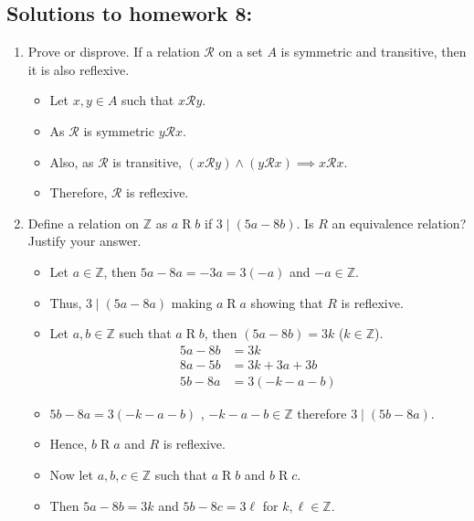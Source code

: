 \documentclass[letterpaper,12pt]{article}
\begin{document}
\subsection*{Solutions to homework 8:}

\begin{enumerate}
\item Prove or disprove. If a relation $\mathcal{R}$ on a set $A$ is symmetric and transitive, then it is also reflexive.
\begin{itemize}
	\item Let $x,y \in A$ such that $x \mathrel \mathcal{R} y$. 
	\item As $\mathcal{R}$ is symmetric $y \mathrel \mathcal{R} x$.
	\item Also, as $\mathcal{R}$ is transitive, $ (x \mathrel \mathcal{R} y) \wedge
	(y \mathrel \mathcal{R} x) \implies x \mathrel \mathcal{R} x$.
	\item Therefore, $\mathcal{R}$ is reflexive.
\end{itemize}
\item Define a relation on $\mathbb{Z}$ as $a \mathrel R b$ if $ 3 \mid (5a-8b).$ Is $R$ an equivalence relation? Justify your answer.
\begin{itemize}
\item Let $a \in \mathbb{Z}$, then $5a-8a = -3a = 3(-a)$ and $-a \in \mathbb{Z}$.
\item Thus, $3 \mid (5a-8a)$ making $a \mathrel R a$ showing that $R$ is reflexive.
\item Let $a,b \in \mathbb{Z}$ such that $a \mathrel R b$, then $(5a-8b) = 3k$ ($k \in \mathbb{Z}$).
\begin{align}
5a-8b &= 3k \\ 8a-5b &= 3k + 3a+3b \\ 5b -8a &= 3(-k-a-b)	
\end{align}
\item $5b-8a = 3(-k-a-b)$ , $-k-a-b \in \mathbb{Z}$ therefore $3 \mid (5b-8a)$.
\item Hence, $ b \mathrel R a $ and $R$ is reflexive.
\item Now let $a,b,c \in  \mathbb{Z}$ such that $a \mathrel R b $ and $b \mathrel R c$.
\item Then $5a-8b = 3k$ and $5b-8c = 3\ell$ for $k,\ell \in \mathbb{Z}$.

\end{itemize}
\end{enumerate}
\end{document}
